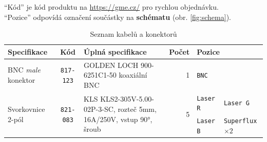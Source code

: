 \documentclass[twoside,project,skipblank]{../MFFPrace}
\begin{document}
\begin{landscape}
\begin{table}[!h]
        \small{
            "`Kód"' je kód produktu na \url{https://gme.cz/} pro rychlou objednávku.\\
            "`Pozice"' odpovídá označení součástky na \textbf{schématu} (obr. \ref{fig:schema}).
        }
        \label{tbl:components}
    \end{table}
    \pagebreak
    \begin{table}[!h]
        \centering
        \caption{Seznam kabelů a konektorů}
        \begin{tabular}{|l|l|l||c|l|r||l|l|l|l|}
            \hline
            \multicolumn{3}{|l||}{\textbf{Specifikace}}                                                          & \textbf{Kód}                            & \textbf{Úplná specifikace}                                                                  & \textbf{Počet}                & \multicolumn{4}{l|}{\textbf{Pozice}}                                                                                                                                                                                                                               \\\hline
            \multicolumn{3}{|l||}{BNC \textit{male} konektor}                                                    & \texttt{817-123}                        & \tiny{GOLDEN LOCH 900-6251C1-50 koaxiální BNC}                                              & 1                             & \texttt{BNC}                                                & \multicolumn{3}{l|}{}                                                                                                                                                                                \\\hline
            \multicolumn{3}{|l||}{\multirow{3}{*}{Svorkovnice 2-pól}}                                            & \multirow{3}{*}{\texttt{821-083}}       & \multirow{3}{*}{\tiny{KLS KLS2-305V-5.00-02P-3-SC, rozteč 5mm, 16A/250V, vstup 90°, šroub}} & \multirow{3}{*}{5}            & \multicolumn{2}{l|}{\texttt{Laser R}}                       & \multicolumn{2}{l|}{\texttt{Laser G}}                                                                                                                                                                \\\cline{7-10}
            \multicolumn{3}{|l||}{}                                                                              &                                         &                                                                                             &                               & \multicolumn{2}{l|}{\texttt{Laser B}}                       & \multicolumn{2}{l|}{\texttt{Superflux} $\times 2$}                                                                                                                                                   \\\cline{7-10}

\end{tabular}
\end{table}
\end{landscape}
\end{document}
